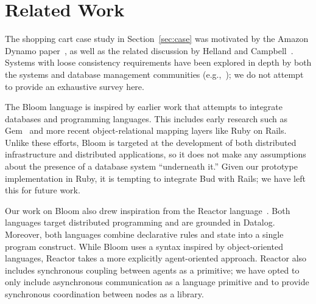 \section{Related Work}
\label{sec:relwork}
The shopping cart case study in Section~\ref{sec:case} was motivated by the
Amazon Dynamo paper~\cite{dynamo}, as well as the related discussion by Helland
and Campbell~\cite{quicksand}. Systems with loose consistency requirements have
been explored in depth by both the systems and database management communities
(e.g.,~\cite{sagas,leases,dangers,bayou}); we do not attempt to provide
an exhaustive survey here.

The Bloom language is inspired by earlier work that attempts to integrate
databases and programming languages.  This includes early research such as
Gem~\cite{gem} and more recent object-relational mapping layers like Ruby on
Rails.  Unlike these efforts, Bloom is targeted at the development of both
distributed infrastructure and distributed applications, so it does not make any
assumptions about the presence of a database system ``underneath it.''  Given
our prototype implementation in Ruby, it is tempting to integrate Bud with
Rails; we have left this for future work.

Our work on Bloom also drew inspiration from the Reactor
language~\cite{reactors}. Both languages target distributed programming and are
grounded in Datalog. Moreover, both languages combine declarative rules and
state into a single program construct. While Bloom uses a syntax inspired by
object-oriented languages, Reactor takes a more explicitly agent-oriented
approach. Reactor also includes synchronous coupling between agents as a
primitive; we have opted to only include asynchronous communication as a
language primitive and to provide synchronous coordination between nodes as a
library.

